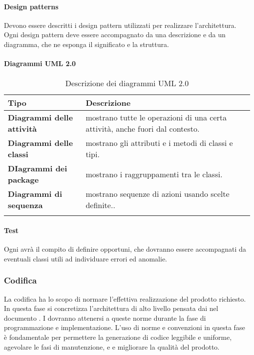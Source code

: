 \paragraph{Design patterns}
Devono essere descritti i design pattern utilizzati per realizzare l'architettura. Ogni design pattern deve essere accompagnato da una descrizione e da un diagramma, che ne esponga il significato e la struttura.
\paragraph*{Diagrammi UML 2.0}

{
\setlength{\freewidth}{\dimexpr\textwidth-0\tabcolsep}
	\renewcommand{\arraystretch}{1.5}
	\setlength{\aboverulesep}{0pt}
	\setlength{\belowrulesep}{0pt}
	\begin{longtable}{L{.210\freewidth} L{.6\freewidth} L{.080\freewidth}}
		\toprule 
		\textbf{Tipo} & \textbf{Descrizione} \\
		\toprule
		\endhead		
		\textbf{Diagrammi delle attività} & mostrano tutte le operazioni di una certa attività, anche fuori dal contesto. \\
		\textbf{Diagrammi delle classi} & mostrano gli attributi e i metodi di classi e tipi.\\
		\textbf{DIagrammi dei package} & mostrano i raggruppamenti tra le classi. \\
		\textbf{Diagrammi di sequenza} & mostrano sequenze di azioni usando scelte definite.. \\
		\bottomrule
		\hiderowcolors
		\caption{Descrizione dei diagrammi UML 2.0}
	\end{longtable}
}
\paragraph*{Test}
Ogni \prog{} avrà il compito di definire  opportuni, che dovranno essere accompagnati da eventuali classi utili ad individuare errori ed anomalie.


\subsubsection{Codifica}
La codifica ha lo scopo di normare l'effettiva realizzazione del prodotto  richiesto. In questa fase si concretizza l'architettura di alto livello pensata dai \progs{} nel documento \PdQ{}. I \progrs{} dovranno attenersi a queste norme durante la fase di programmazione e implementazione. L'uso di norme e convenzioni in questa fase è fondamentale per permettere la generazione di codice leggibile e uniforme, agevolare le fasi di manutenzione,  e  e migliorare la qualità del prodotto.
